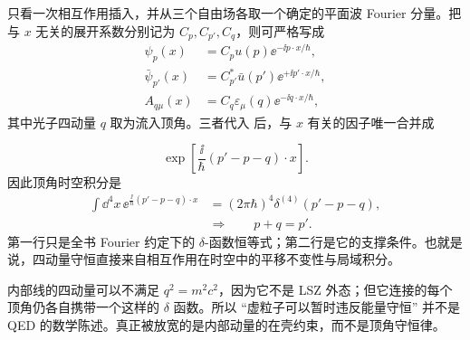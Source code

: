 \begin{derivation}
只看一次相互作用插入，并从三个自由场各取一个确定的平面波 Fourier 分量。把与 $x$ 无关的展开系数分别记为 $C_p,C_{p'},C_q$，则可严格写成
\begin{align*}
 \psi_p(x)&=C_pu(p)\ee^{-\ii p\cdot x/\hbar},\\
 \bar\psi_{p'}(x)&=C_{p'}^*\bar u(p')\ee^{+\ii p'\cdot x/\hbar},\\
 A_{q\mu}(x)&=C_q\varepsilon_\mu(q)\ee^{-\ii q\cdot x/\hbar},
\end{align*}
其中光子四动量 $q$ 取为流入顶角。三者代入 后，与 $x$ 有关的因子唯一合并成

\begin{equation*}
 \exp\!\left[
 \frac{\ii}{\hbar}(p'-p-q)\cdot x
 \right].
\end{equation*}
因此顶角时空积分是
\begin{align*}
 \int\dd^4 x\,
 \ee^{\frac{\ii}{\hbar}(p'-p-q)\cdot x}
 &=(2\pi\hbar)^4
 \delta^{(4)}(p'-p-q),\\
 &\Longrightarrow\qquad p+q=p'.
 \end{align*}
第一行只是全书 Fourier 约定下的 $\delta$-函数恒等式；第二行是它的支撑条件。也就是说，四动量守恒直接来自相互作用在时空中的平移不变性与局域积分。

内部线的四动量可以不满足 $q^2=m^2c^2$，因为它不是 LSZ 外态；但它连接的每个顶角仍各自携带一个这样的 \(\delta\) 函数。所以 ``虚粒子可以暂时违反能量守恒'' 并不是 QED 的数学陈述。真正被放宽的是内部动量的在壳约束，而不是顶角守恒律。
\end{derivation}

